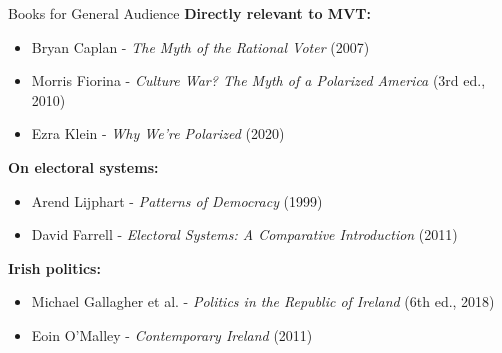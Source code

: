 \documentclass[10pt]{beamer}
\begin{document}
\begin{frame}{Books for General Audience}
\textbf{Directly relevant to MVT:}
\begin{itemize}
\item Bryan Caplan - \emph{The Myth of the Rational Voter} (2007)
\item Morris Fiorina - \emph{Culture War? The Myth of a Polarized America} (3rd ed., 2010)
\item Ezra Klein - \emph{Why We're Polarized} (2020)
\end{itemize}


\textbf{On electoral systems:}
\begin{itemize}
\item Arend Lijphart - \emph{Patterns of Democracy} (1999)
\item David Farrell - \emph{Electoral Systems: A Comparative Introduction} (2011)
\end{itemize}


\textbf{Irish politics:}
\begin{itemize}
\item Michael Gallagher et al. - \emph{Politics in the Republic of Ireland} (6th ed., 2018)
\item Eoin O'Malley - \emph{Contemporary Ireland} (2011)
\end{itemize}
\end{frame}
\end{document}
